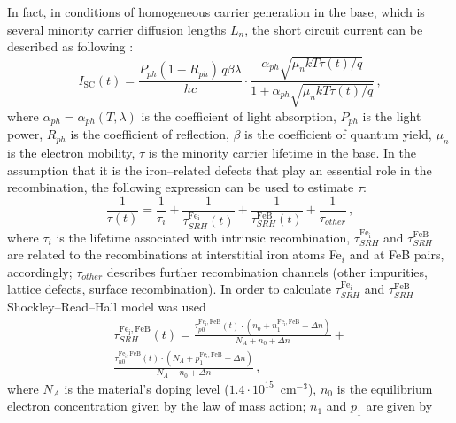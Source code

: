 \documentclass[%
 aip,jap,
 amsmath,amssymb,
 reprint,%
]{revtex4-1}
\begin{document}
In fact, in conditions of homogeneous carrier generation in the base, which is several minority carrier diffusion lengths $L_n$,
the short circuit current can be described as following \cite{Bube,Razeghi}:
\begin{equation}
\label{eqIsc}
I_\mathrm{SC}(t)=\frac{P_{ph}(1-R_{ph})\,q\beta\lambda}{hc}\cdot
\frac{\alpha_{ph}\sqrt{\mu_n k T \tau(t)/q}}{1+\alpha_{ph}\sqrt{\mu_n k T \tau(t)/q}}\,,
\end{equation}
where
$\alpha_{ph}=\alpha_{ph}(T,\lambda)$ is the coefficient of light absorption,
$P_{ph}$ is the light power,
$R_{ph}$ is the coefficient of reflection,
$\beta$ is the coefficient of quantum  yield,
$\mu_n$ is the electron mobility,
$\tau$ is the minority carrier lifetime in the base.
In the assumption that it is the iron--related defects that play an essential role in the recombination, the following expression can be used to estimate $\tau$:
\begin{equation}
\label{eqTau}
\frac{1}{\tau(t)}=\frac{1}{\tau_i}+\frac{1}{\tau_{SRH}^{\mathrm{Fe_i}}(t)}
+\frac{1}{\tau_{SRH}^\mathrm{FeB}(t)}+\frac{1}{\tau_{other}}\,,
\end{equation}
where
$\tau_i$ is the lifetime associated with intrinsic recombination,
$\tau_{SRH}^{\mathrm{Fe_i}}$ and $\tau_{SRH}^\mathrm{FeB}$ are related to the recombinations at interstitial iron atoms Fe$_i$ and at FeB pairs, accordingly;
$\tau_{other}$ describes further recombination channels
(other impurities, lattice defects, surface recombination).
In order to calculate $\tau_{SRH}^{\mathrm{Fe_i}}$ and $\tau_{SRH}^\mathrm{FeB}$
Shockley--Read--Hall model was used
\begin{eqnarray}
\label{eqTauSRH}
\tau_{SRH}^\mathrm{Fe_i,FeB}(t)=\frac{\tau_{p0}^\mathrm{Fe_i,FeB}(t)
\cdot(n_0+n_1^\mathrm{Fe_i,FeB}+\Delta n)}
{N_A+n_0+\Delta n}+\nonumber\\
\frac{\tau_{n0}^\mathrm{Fe_i,FeB}(t)\cdot(N_A+p_1^\mathrm{Fe_i,FeB}+\Delta n)}
{N_A+n_0+\Delta n}\,,
\end{eqnarray}
where
$N_A$ is the material’s doping level ($1.4\cdot10^{15}$~cm$^{-3}$),
$n_0$ is the equilibrium electron concentration given by the law of mass action;
$n_1$ and $p_1$ are given by
\end{document}

